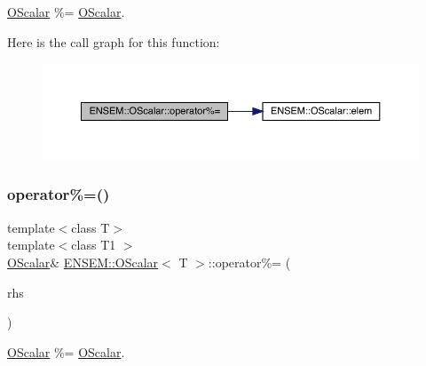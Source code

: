 \mbox{\hyperlink{classENSEM_1_1OScalar}{O\+Scalar}} \%= \mbox{\hyperlink{classENSEM_1_1OScalar}{O\+Scalar}}. 

Here is the call graph for this function\+:
\nopagebreak
\begin{figure}[H]
\begin{center}
\leavevmode
\includegraphics[width=350pt]{da/d80/classENSEM_1_1OScalar_a89a76b1229e185250c0b9c48ae13d98b_cgraph}
\end{center}
\end{figure}
\mbox{\label{classENSEM_1_1OScalar_a89a76b1229e185250c0b9c48ae13d98b}} 
\subsubsection{\texorpdfstring{operator\%=()}{operator\%=()}\hspace{0.1cm}{\footnotesize\ttfamily [2/3]}}
{\footnotesize\ttfamily template$<$class T$>$ \\
template$<$class T1 $>$ \\
\mbox{\hyperlink{classENSEM_1_1OScalar}{O\+Scalar}}\& \mbox{\hyperlink{classENSEM_1_1OScalar}{E\+N\+S\+E\+M\+::\+O\+Scalar}}$<$ T $>$\+::operator\%= (\begin{DoxyParamCaption}\item[{const \mbox{\hyperlink{classENSEM_1_1OScalar}{O\+Scalar}}$<$ T1 $>$ \&}]{rhs }\end{DoxyParamCaption})\hspace{0.3cm}{\ttfamily [inline]}}



\mbox{\hyperlink{classENSEM_1_1OScalar}{O\+Scalar}} \%= \mbox{\hyperlink{classENSEM_1_1OScalar}{O\+Scalar}}. 


